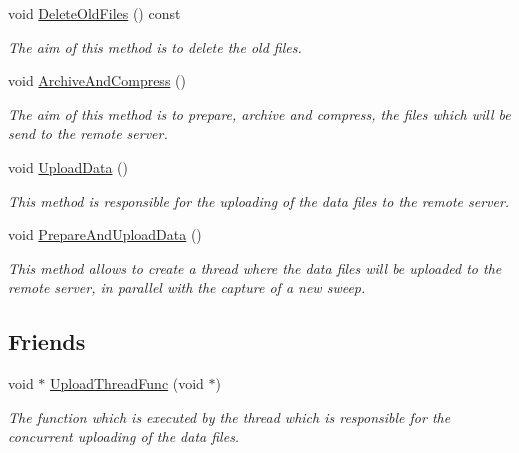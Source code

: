 \begin{DoxyCompactItemize}
\mbox{\label{classDataLogger_a4fd6e432dd4348cbe3b02a0fd6969ab5}} 
void \hyperlink{classDataLogger_a4fd6e432dd4348cbe3b02a0fd6969ab5}{Delete\+Old\+Files} () const
\begin{DoxyCompactList}\small\item\em The aim of this method is to delete the old files. \end{DoxyCompactList}\item 
void \hyperlink{classDataLogger_a147fb7eaee1c38bbf57ef2d6cddf70d5}{Archive\+And\+Compress} ()
\begin{DoxyCompactList}\small\item\em The aim of this method is to prepare, archive and compress, the files which will be send to the remote server. \end{DoxyCompactList}\item 
void \hyperlink{classDataLogger_ab58f4cc05f738ef757c884fe9ef131eb}{Upload\+Data} ()
\begin{DoxyCompactList}\small\item\em This method is responsible for the uploading of the data files to the remote server. \end{DoxyCompactList}\item 
void \hyperlink{classDataLogger_a98ea7aaa941bbddea8069415e1652759}{Prepare\+And\+Upload\+Data} ()
\begin{DoxyCompactList}\small\item\em This method allows to create a thread where the data files will be uploaded to the remote server, in parallel with the capture of a new sweep. \end{DoxyCompactList}\end{DoxyCompactItemize}
\subsection*{Friends}
\begin{DoxyCompactItemize}
\item 
\mbox{\label{classDataLogger_a0cabdadaf836f897a111e72ab29d42f6}} 
void $\ast$ \hyperlink{classDataLogger_a0cabdadaf836f897a111e72ab29d42f6}{Upload\+Thread\+Func} (void $\ast$)
\begin{DoxyCompactList}\small\item\em The function which is executed by the thread which is responsible for the concurrent uploading of the data files. \end{DoxyCompactList}\end{DoxyCompactItemize}


